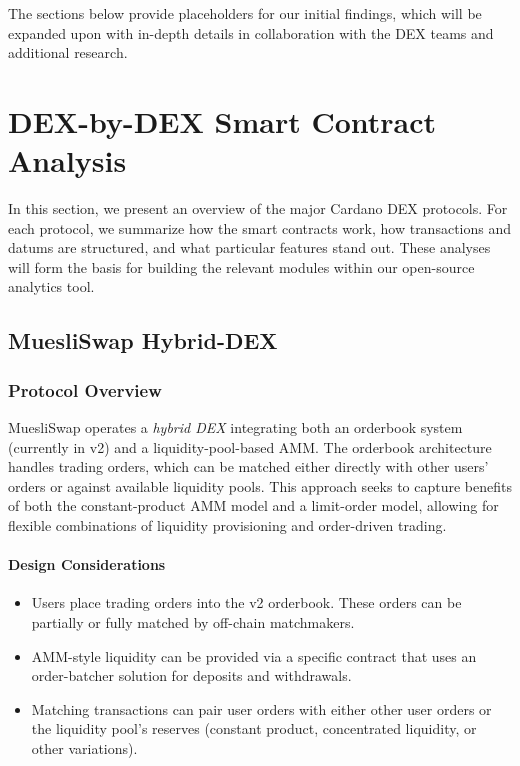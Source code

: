 \documentclass{article}
\begin{document}
The sections below provide placeholders for our initial findings, which will be expanded upon with in-depth details in collaboration with the DEX teams and additional research.

\section{DEX-by-DEX Smart Contract Analysis}
\label{sec:dex_analysis}
In this section, we present an overview of the major Cardano DEX protocols. For each protocol, we summarize how the smart contracts work, how transactions and datums are structured, and what particular features stand out. These analyses will form the basis for building the relevant modules within our open-source analytics tool.


\subsection{MuesliSwap Hybrid-DEX}
\label{sec:muesli_hybrid}

\subsubsection{Protocol Overview}
MuesliSwap operates a \emph{hybrid DEX} integrating both an orderbook system (currently in v2) and a liquidity-pool-based AMM. The orderbook architecture handles trading orders, which can be matched either directly with other users’ orders or against available liquidity pools. This approach seeks to capture benefits of both the constant-product AMM model and a limit-order model, allowing for flexible combinations of liquidity provisioning and order-driven trading.

\paragraph{Design Considerations}
\begin{itemize}
    \item Users place trading orders into the v2 orderbook. These orders can be partially or fully matched by off-chain matchmakers.
    \item AMM-style liquidity can be provided via a specific contract that uses an order-batcher solution for deposits and withdrawals. 
    \item Matching transactions can pair user orders with either other user orders or the liquidity pool’s reserves (constant product, concentrated liquidity, or other variations).
\end{itemize}
\end{document}
